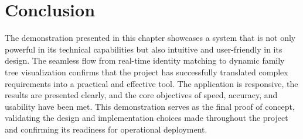 \section{Conclusion}
The demonstration presented in this chapter showcases a system that is not only powerful in its technical capabilities but also intuitive and user-friendly in its design. The seamless flow from real-time identity matching to dynamic family tree visualization confirms that the project has successfully translated complex requirements into a practical and effective tool. The application is responsive, the results are presented clearly, and the core objectives of speed, accuracy, and usability have been met. This demonstration serves as the final proof of concept, validating the design and implementation choices made throughout the project and confirming its readiness for operational deployment.
